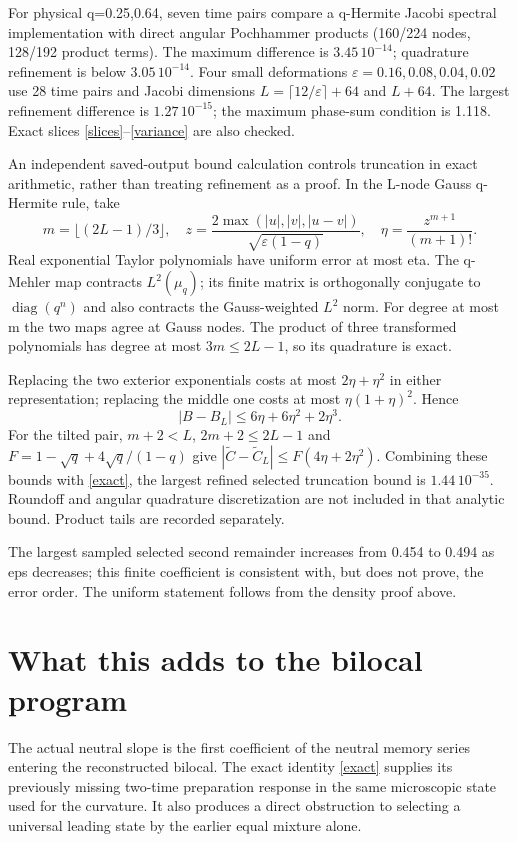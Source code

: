 \documentclass[11pt]{article}
\newcommand{\eps}{\varepsilon}
\begin{document}
For physical q=0.25,0.64, seven time pairs compare a q-Hermite
Jacobi spectral implementation with direct angular Pochhammer
products (160/224 nodes, 128/192 product terms).
The maximum difference is $3.45\,10^{-14}$; quadrature refinement
is below $3.05\,10^{-14}$. Four small deformations
$\eps=0.16,0.08,0.04,0.02$ use 28 time pairs and Jacobi
dimensions $L=\lceil12/\eps\rceil+64$ and $L+64$.
The largest refinement difference is $1.27\,10^{-15}$;
the maximum phase-sum condition is 1.118.
Exact slices \eqref{slices}--\eqref{variance} are also checked.

An independent saved-output bound calculation controls truncation
in exact arithmetic, rather than treating refinement as a proof.
In the L-node Gauss q-Hermite rule, take
\[
 m=\lfloor(2L-1)/3\rfloor,\quad
 z=\frac{2\max(|u|,|v|,|u-v|)}{\sqrt{\eps(1-q)}},\quad
 \eta=\frac{z^{m+1}}{(m+1)!}.
\]
Real exponential Taylor polynomials have uniform error at most
eta. The q-Mehler map contracts $L^2(\mu_q)$; its finite matrix
is orthogonally conjugate to $\operatorname{diag}(q^n)$ and also
contracts the Gauss-weighted $L^2$ norm. For degree at most m
the two maps agree at Gauss nodes. The product of three
transformed polynomials has degree at most $3m\le2L-1$,
so its quadrature is exact.

Replacing the two exterior exponentials costs at most
$2\eta+\eta^2$ in either representation; replacing the middle
one costs at most $\eta(1+\eta)^2$. Hence
\[
 |B-B_L|\le6\eta+6\eta^2+2\eta^3.
\]
For the tilted pair, $m+2<L$, $2m+2\le2L-1$ and
$F=1-\sqrt q+4\sqrt q/(1-q)$ give
$|\widetilde C-\widetilde C_L|\le F(4\eta+2\eta^2)$.
Combining these bounds with \eqref{exact}, the largest refined
selected truncation bound is $1.44\,10^{-35}$.
Roundoff and angular quadrature discretization are not included
in that analytic bound. Product tails are recorded separately.

The largest sampled selected second remainder increases from
0.454 to 0.494 as eps decreases; this finite coefficient is
consistent with, but does not prove, the error order.
The uniform statement follows from the density proof above.

\newpage
\section{What this adds to the bilocal program}
The actual neutral slope is the first coefficient of the
neutral memory series entering the reconstructed bilocal.
The exact identity \eqref{exact} supplies its previously missing
two-time preparation response in the same microscopic state
used for the curvature. It also produces a direct obstruction
to selecting a universal leading state by the earlier equal
mixture alone.
\end{document}
